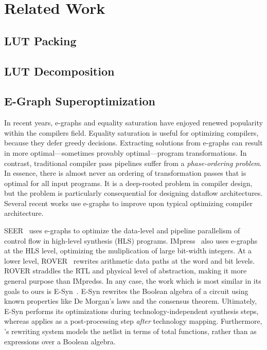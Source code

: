 \section{Related Work}\label{sec:relatedwork}

\subsection{LUT Packing}\label{sec:relatedwork:packing}

\subsection{LUT Decomposition}\label{sec:relatedwork:decomp}

\subsection{E-Graph Superoptimization}\label{sec:relatedwork:egraph}
In recent years, e-graphs and equality saturation have enjoyed renewed
popularity within the compilers field. Equality saturation is useful for
optimizing compilers, because they defer greedy decisions. Extracting solutions
from e-graphs can result in more optimal---sometimes provably optimal---program
transformations. In contrast, traditional compiler pass pipelines suffer from a
\textit{phase-ordering problem}. In essence, there is almost never an ordering
of transformation passes that is optimal for all input programs. It is a
deep-rooted problem in compiler design, but the problem is particularly
consequential for designing dataflow architectures. Several recent works use
e-graphs to improve upon typical optimizing compiler architecture.

SEER~\cite{seer} uses e-graphs to optimize the data-level and pipeline
parallelism of control flow in high-level synthesis (HLS) programs.
IMpress~\cite{impress} also uses e-graphs at the HLS level, optimizing the
muliplication of large bit-width integers. At a lower level,
ROVER~\cite{rover,roverbl,egraphconstraints} rewrites arithmetic data paths at
the word and bit levels. ROVER straddles the RTL and physical level of
abstraction, making it more general purpose than IMpredss. In any case, the
work which is most similar in its goals to ours is E-Syn~\cite{esynth}. E-Syn
rewrites the Boolean algebra of a circuit using known properties like De
Morgan's laws and the consensus theorem. Ultimately, E-Syn performs its
optimizations during technology-independent synthesis steps, whereas
\shortname{} applies as a post-processing step \textit{after} technology
mapping. Furthermore, \shortname{}'s rewriting system models the netlist in
terms of total functions, rather than as expressions over a Boolean algebra.